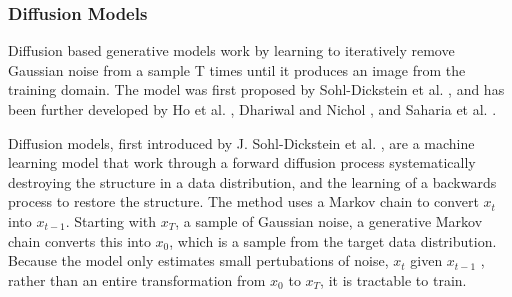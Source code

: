\documentclass{UoYCSproject}
\begin{document}
\subsubsection{Diffusion Models}


Diffusion based generative models work by learning to iteratively remove Gaussian noise from a sample T times until it produces an image from the training domain. The model was first proposed by Sohl-Dickstein et al. \cite{sohldickstein2015deep}, and has been further developed by Ho et al. \cite{ho2020denoising},  Dhariwal and Nichol \cite{dhariwal2021diffusion}, and Saharia et al. \cite{saharia2022palette}. 


Diffusion models, first introduced by J. Sohl-Dickstein et al. \cite{sohldickstein2015deep}, are a machine learning model that work through a forward diffusion process systematically destroying the structure in a data distribution, and the learning of a backwards process to restore the structure. The method uses a Markov chain to convert $ x_t $ into $ x_{t-1} $. Starting with $ x_T $, a sample of Gaussian noise, a generative Markov chain converts this into $ x_0 $, which is a sample from the target data distribution. Because the model only estimates small pertubations of noise, $ x_t $ given $ x_{t-1} $ , rather than an entire transformation from $ x_0 $ to $ x_T $, it is tractable to train. 
\end{document}
